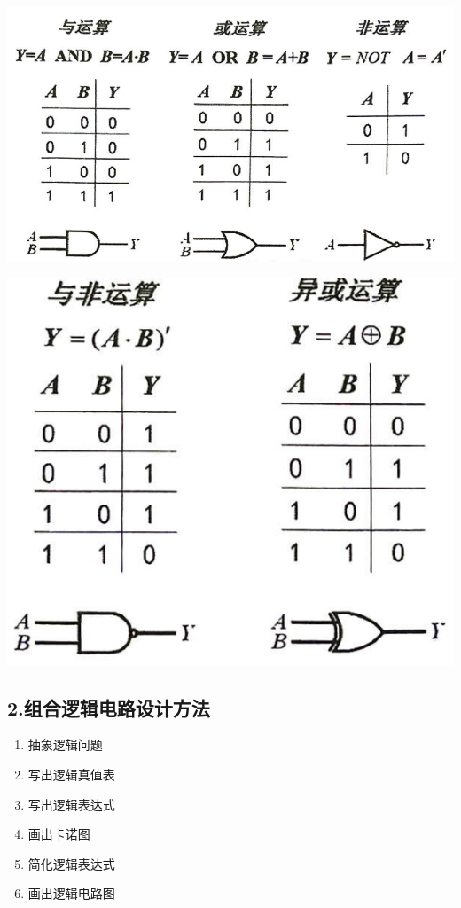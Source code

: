 \documentclass{ctexart}
\begin{document}
    \begin{minipage}[c]{0.6\textwidth}
        \centering
        \includegraphics[width=1\linewidth]{2.1.png} 
        
    \end{minipage}
    \begin{minipage}[c]{0.4\textwidth}
        \centering
        \includegraphics[width=1\linewidth]{2.2.png} 
        
    \end{minipage}
    \subsection*{2.组合逻辑电路设计方法}
    \begin{enumerate}[(1)]
        \item 抽象逻辑问题
        \item 写出逻辑真值表
        \item 写出逻辑表达式
        \item 画出卡诺图
        \item 简化逻辑表达式
        \item 画出逻辑电路图
    \end{enumerate}
\end{document}
